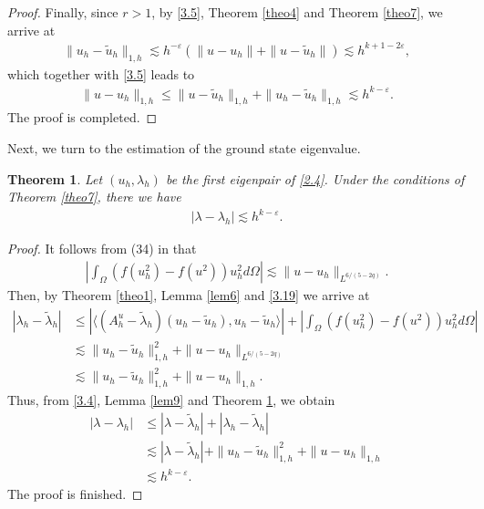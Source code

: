 \documentclass[compress, preprint,9pt]{elsarticle}
\numberwithin{equation}{section}
\newtheorem{theo}{Theorem}[section]
\newcommand{\eps}{\varepsilon}
\newcommand{\la}{\langle}
\newcommand{\ran}{\rangle}
\begin{document}
\begin{proof}
	Finally, since $r>1$, by \eqref{3.5}, Theorem \ref{theo4} and Theorem \ref{theo7}, we arrive at
	\begin{eqnarray*}
		\|u_h-\widetilde{u}_h\|_{1,h}\lesssim h^{-\eps}(\|u-u_h\|+\|u-\widetilde{u}_h\|)
		\lesssim h^{k+1-2\eps},
	\end{eqnarray*}
	which together with \eqref{3.5} leads to
	\begin{eqnarray*}
		\|u-u_h\|_{1,h}\le \|u-\widetilde{u}_h\|_{1,h}+\|u_h-\widetilde{u}_h\|_{1,h}\lesssim h^{k-\eps}.
	\end{eqnarray*}
	The proof is completed.
\end{proof}


Next, we turn to the estimation of the ground state eigenvalue.
\begin{theo}\label{theo9}
	Let $(u_h,\lambda_h)$ be the first eigenpair of \eqref{2.4}. Under the conditions of Theorem \ref{theo7}, there we have
	\begin{eqnarray*}
		|\lambda-\lambda_h|\lesssim h^{k-\eps}.
	\end{eqnarray*}
\end{theo}
\begin{proof}
	It follows from (34) in \cite{Eric2009} that
	\begin{eqnarray*}
		\left|\int_\Omega (f(u_h^2)-f(u^2))u_h^2 d\Omega\right|\lesssim\|u-u_h\|_{L^{6/(5-2q)}}.
	\end{eqnarray*}
	Then, by Theorem \ref{theo1}, Lemma \ref{lem6} and \eqref{3.19} we arrive at
	\begin{eqnarray*}
		|\lambda_h-\widetilde{\lambda}_h|&\le|\la (A_h^u-\widetilde{\lambda}_h)(u_h-\widetilde{u}_h),u_h-\widetilde{u}_h\ran|+\left|\int_\Omega (f(u_h^2)-f(u^2))u_h^2 d\Omega\right|
		\\
		&\lesssim \|u_h-\widetilde{u}_h\|_{1,h}^2+\|u-u_h\|_{L^{6/(5-2q)}}
		\\
		&\lesssim \|u_h-\widetilde{u}_h\|_{1,h}^2+\|u-u_h\|_{1,h}.
	\end{eqnarray*}
	Thus, from \eqref{3.4}, Lemma \ref{lem9} and Theorem \ref{theo9}, we obtain
	\begin{eqnarray*}
		|\lambda-\lambda_h|&\le|\lambda-\widetilde{\lambda}_h|+|\lambda_h-\widetilde{\lambda}_h|
		\\
		&\lesssim|\lambda-\widetilde{\lambda}_h|+\|u_h-\widetilde{u}_h\|_{1,h}^2+\|u-u_h\|_{1,h}
		\\
		&\lesssim h^{k-\eps}.
	\end{eqnarray*}
	The proof is finished.
\end{proof}
\end{document}
